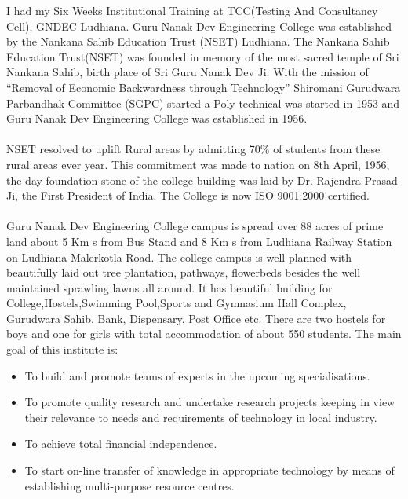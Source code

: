 
I had my Six Weeks Institutional Training at TCC(Testing And Consultancy Cell), GNDEC
Ludhiana. Guru Nanak Dev Engineering College was established by the Nankana Sahib
Education Trust (NSET) Ludhiana. The Nankana Sahib Education Trust(NSET) was founded in
memory of the most sacred temple of Sri Nankana Sahib, birth place of Sri Guru Nanak Dev Ji.
With the mission of “Removal of Economic Backwardness through Technology” Shiromani
Gurudwara Parbandhak Committee (SGPC) started a Poly technical was started in 1953 and
Guru Nanak Dev Engineering College was established in 1956.\\\\
NSET resolved to uplift Rural areas by admitting 70\% of students from these rural areas ever
year. This commitment was made to nation on 8th April, 1956, the day foundation stone of the
college building was laid by Dr. Rajendra Prasad Ji, the First President of India. The College is
now ISO 9001:2000 certified.\\\\
Guru Nanak Dev Engineering College campus is spread over 88 acres of prime land about 5
Km s from Bus Stand and 8 Km s from Ludhiana Railway Station on Ludhiana-Malerkotla
Road. The college campus is well planned with beautifully laid out tree plantation, pathways,
flowerbeds besides the well maintained sprawling lawns all around. It has beautiful building for
College,Hostels,Swimming Pool,Sports and Gymnasium Hall Complex, Gurudwara Sahib,
Bank, Dispensary, Post Office etc. There are two hostels for boys and one for girls with total
accommodation of about 550 students. The main goal of this institute is:\\
\begin{itemize}
\item To build and promote teams of experts in the upcoming specialisations.
\item To promote quality research and undertake research projects keeping in view their
relevance to needs and requirements of technology in local industry.
\item To achieve total financial independence.
\item To start on-line transfer of knowledge in appropriate technology by means of
establishing multi-purpose resource centres.
\end{itemize}

\newpage
